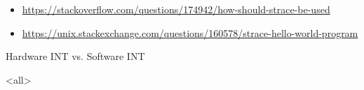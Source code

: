 \begin{itemize}
\item \url{https://stackoverflow.com/questions/174942/how-should-strace-be-used}
\item \url{https://unix.stackexchange.com/questions/160578/strace-hello-world-program}
\end{itemize}

\begin{frame}{Hardware INT vs. Software INT}
  \begin{center}
  \end{center}
\end{frame}

\begin{frame}
  \begin{refsection}
    \nocite{wiki:interrupt, wiki:syscall}
    \printbibliography[heading=none]
  \end{refsection}
\end{frame}
\mode<all>


